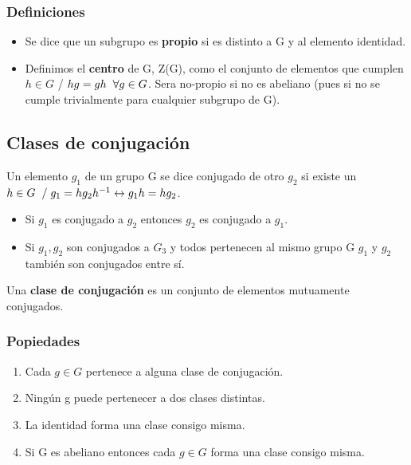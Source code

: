 \documentclass{article}
\begin{document}
\subsubsection{Definiciones}

\begin{itemize}
    \item Se dice que un subgrupo es \textbf{propio} si es distinto a G y al elemento identidad.
    \item Definimos el \textbf{centro} de G, Z(G), como el conjunto de elementos que cumplen $h\in G$ / $hg=gh \hspace{0.2cm} \forall g \in G$. Sera no-propio si no es abeliano (pues si no se cumple trivialmente para cualquier subgrupo de G).
\end{itemize}

\subsection{Clases de conjugación}

Un elemento $g_1$ de un grupo G se dice conjugado de otro $g_2$ si existe un $h\in G \hspace{0.2cm} / \hspace{0.1cm} g_1=hg_2h^{-1} \leftrightarrow g_1h=hg_2$.

\begin{itemize}
    \item Si $g_1$ es conjugado a $g_2$ entonces $g_2$ es conjugado a $g_1$.
    \item Si $g_1,g_2$ son conjugados a $G_3$ y todos pertenecen al mismo grupo G $g_1$ y $g_2$ también son conjugados entre sí.
\end{itemize}

Una \textbf{clase de conjugación} es un conjunto de elementos mutuamente conjugados.

\subsubsection{Popiedades}

\begin{enumerate}
    \item Cada $g\in G$ pertenece a alguna clase de conjugación.
    \item Ningún g puede pertenecer a dos clases distintas.
    \item La identidad forma una clase consigo misma.
    \item Si G es abeliano entonces cada $g\in G$ forma una clase consigo misma.
\end{enumerate}
\end{document}
